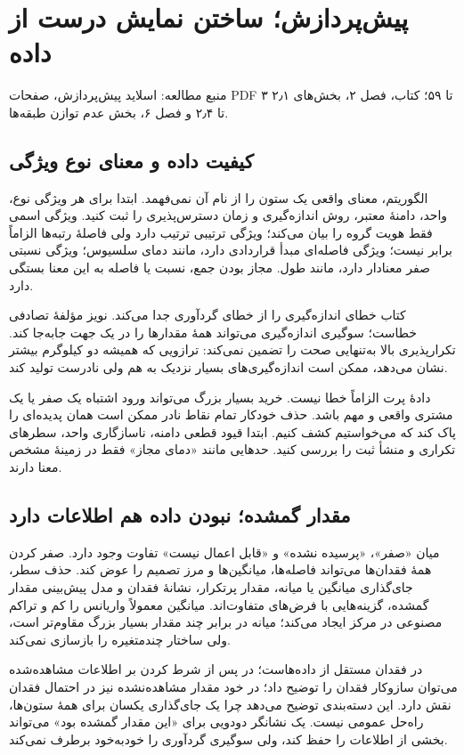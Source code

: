 \documentclass[12pt,a4paper,oneside]{report}
\newcounter{ex}[chapter]
\newcommand{\source}[1]{\par{\small\color{muted} منبع مطالعه: #1}\par}
\begin{document}
\chapter{پیش‌پردازش؛ ساختن نمایش درست از داده}
\source{اسلاید پیش‌پردازش، صفحات PDF ۳ تا ۵۹؛ کتاب، فصل ۲، بخش‌های ۲٫۱ تا ۲٫۴ و فصل ۶، بخش عدم توازن طبقه‌ها.}

\section{کیفیت داده و معنای نوع ویژگی}
الگوریتم، معنای واقعی یک ستون را از نام آن نمی‌فهمد. ابتدا برای هر ویژگی نوع، واحد، دامنهٔ معتبر، روش اندازه‌گیری و زمان دسترس‌پذیری را ثبت کنید. ویژگی اسمی  فقط هویت گروه را بیان می‌کند؛ ویژگی ترتیبی  ترتیب دارد ولی فاصلهٔ رتبه‌ها الزاماً برابر نیست؛ ویژگی فاصله‌ای مبدأ قراردادی دارد، مانند دمای سلسیوس؛ ویژگی نسبتی صفر معنادار دارد، مانند طول. مجاز بودن جمع، نسبت یا فاصله به این معنا بستگی دارد.

کتاب خطای اندازه‌گیری را از خطای گردآوری جدا می‌کند. نویز مؤلفهٔ تصادفی خطاست؛ سوگیری اندازه‌گیری می‌تواند همهٔ مقدارها را در یک جهت جابه‌جا کند. تکرارپذیری بالا به‌تنهایی صحت را تضمین نمی‌کند: ترازویی که همیشه دو کیلوگرم بیشتر نشان می‌دهد، ممکن است اندازه‌گیری‌های بسیار نزدیک به هم ولی نادرست تولید کند.

دادهٔ پرت  الزاماً خطا نیست. خرید بسیار بزرگ می‌تواند ورود اشتباه یک صفر یا یک مشتری واقعی و مهم باشد. حذف خودکار تمام نقاط نادر ممکن است همان پدیده‌ای را پاک کند که می‌خواستیم کشف کنیم. ابتدا قیود قطعی دامنه، ناسازگاری واحد، سطرهای تکراری و منشأ ثبت را بررسی کنید. حدهایی مانند «دمای مجاز» فقط در زمینهٔ مشخص معنا دارند.

\section{مقدار گمشده؛ نبودن داده هم اطلاعات دارد}
میان «صفر»، «پرسیده نشده» و «قابل اعمال نیست» تفاوت وجود دارد. صفر کردن همهٔ فقدان‌ها می‌تواند فاصله‌ها، میانگین‌ها و مرز تصمیم را عوض کند. حذف سطر، جای‌گذاری میانگین یا میانه، مقدار پرتکرار، نشانهٔ فقدان و مدل پیش‌بینی مقدار گمشده، گزینه‌هایی با فرض‌های متفاوت‌اند. میانگین معمولاً واریانس را کم و تراکم مصنوعی در مرکز ایجاد می‌کند؛ میانه در برابر چند مقدار بسیار بزرگ مقاوم‌تر است، ولی ساختار چندمتغیره را بازسازی نمی‌کند.

در  فقدان مستقل از داده‌هاست؛ در  پس از شرط کردن بر اطلاعات مشاهده‌شده می‌توان سازوکار فقدان را توضیح داد؛ در  خود مقدار مشاهده‌نشده نیز در احتمال فقدان نقش دارد. این دسته‌بندی توضیح می‌دهد چرا یک جای‌گذاری یکسان برای همهٔ ستون‌ها، راه‌حل عمومی نیست. یک نشانگر دودویی برای «این مقدار گمشده بود» می‌تواند بخشی از اطلاعات را حفظ کند، ولی سوگیری گردآوری را خودبه‌خود برطرف نمی‌کند.
\end{document}
